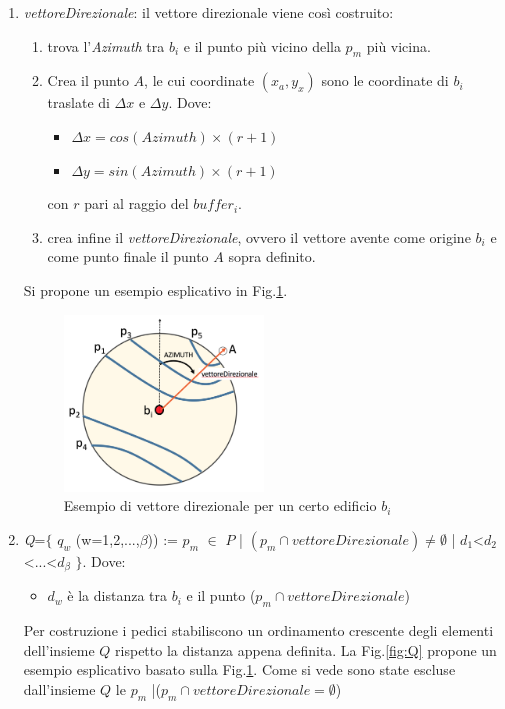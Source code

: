 \begin{enumerate}
\item \textit{vettoreDirezionale}: il vettore direzionale viene così costruito:
	\begin{enumerate}
	\item trova l'\textit{Azimuth} tra $b_i$ e il punto più vicino della $p_m$ più vicina.
    \item Crea il punto $A$, le cui coordinate $(x_a,y_x)$ sono le coordinate di $b_i$ traslate di $\Delta{x}$ e $\Delta{y}$. \newline
    Dove:
    	\begin{itemize}
    		\item $\Delta{x}= cos (Azimuth) \times (r+1)$
            \item $\Delta{y}= sin (Azimuth) \times (r+1)$
    	\end{itemize}
    con $r$ pari al raggio del $buffer_i$.
    \item crea infine il \textit{vettoreDirezionale}, ovvero il vettore avente come origine $b_i$ e come punto finale il punto $A$ sopra definito.
	\end{enumerate}
    Si propone un esempio esplicativo in Fig.\ref{fig:vettore}.
  \begin{figure}[bth]
  \centering
    \includegraphics[width=0.5\textwidth]{img/vettore}
      \caption{Esempio di vettore direzionale per un certo edificio $b_i$}
        \label{fig:vettore}

\end{figure}
\newpage
\item \textit{Q}=$\{$ $q_w$ (w=1,2,...,$\beta$)) :=  $p_m$ $\in$ $P$ | $(p_m \cap vettoreDirezionale) \neq \emptyset$ | $d_1$<$d_2$<...<$d_\beta$ $\}$.
\newline
Dove:
\begin{itemize}
\item $d_w$ è la distanza tra $b_i$ e il punto ($p_m \cap vettoreDirezionale$) 
\end{itemize}
Per costruzione i pedici stabiliscono un ordinamento crescente degli elementi dell'insieme $Q$ rispetto la distanza appena definita.\newline
La Fig.\ref{fig:Q} propone un esempio esplicativo basato sulla Fig.\ref{fig:vettore}. Come si vede sono state escluse dall'insieme $Q$ le $p_m$ |($p_m \cap vettoreDirezionale = \emptyset$)  



\end{enumerate}
